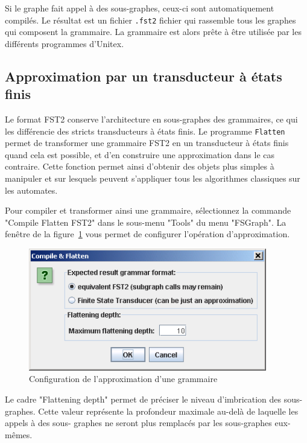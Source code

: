 \noindent Si le graphe fait appel à des sous-graphes, ceux-ci sont automatiquement compilés. Le
résultat est un fichier \verb+.fst2+ fichier qui rassemble tous les
graphes qui composent la grammaire. La grammaire est alors prête à être utilisée par les
différents programmes d’Unitex.


\subsection{Approximation par un transducteur à états finis}
Le format FST2 conserve l’architecture en sous-graphes des grammaires, ce qui les différencie
des stricts transducteurs à états finis. Le programme \verb+Flatten+ permet de transformer
une grammaire FST2 en un transducteur à états finis quand cela est possible, et d’en
construire une approximation dans le cas contraire. Cette fonction permet ainsi d’obtenir des objets
plus simples à manipuler et sur lesquels peuvent s’appliquer tous les algorithmes classiques sur
les automates.


\bigskip
\noindent Pour compiler et transformer ainsi une grammaire, sélectionnez la commande "Compile
Flatten FST2" dans le sous-menu "Tools" du menu "FSGraph". La fenêtre de la figure~\ref{fig-flatten-configuration}
vous permet de configurer l’opération d’approximation.

\bigskip
\begin{figure}[!h]
\begin{center}
\includegraphics[width=10.4cm]{resources/img/fig6-5.png}
\caption{Configuration de l’approximation d’une grammaire\label{fig-flatten-configuration}}
\end{center}
\end{figure}

\noindent Le cadre "Flattening depth" permet de préciser le niveau d’imbrication des sous-graphes.
Cette valeur représente la profondeur maximale au-delà de laquelle les appels à des sous-
graphes ne seront plus remplacés par les sous-graphes eux-mêmes.


